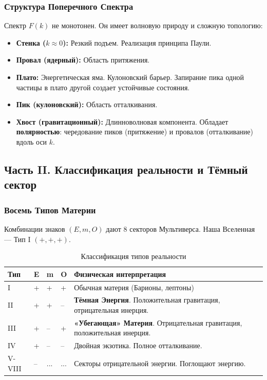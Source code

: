 \documentclass[12pt,a4paper]{article}
\begin{document}
\subsubsection{Структура Поперечного Спектра}
Спектр $F(k)$ не монотонен. Он имеет волновую природу и сложную топологию:
\begin{itemize}
    \item \textbf{Стенка ($k \approx 0$):} Резкий подъем. Реализация принципа Паули.
    \item \textbf{Провал (ядерный):} Область притяжения.
    \item \textbf{Плато:} Энергетическая яма. Кулоновский барьер. Запирание пика одной частицы в плато другой создает устойчивые состояния.
    \item \textbf{Пик (кулоновский):} Область отталкивания.
    \item \textbf{Хвост (гравитационный):} Длинноволновая компонента. Обладает \textbf{полярностью}: чередование пиков (притяжение) и провалов (отталкивание) вдоль оси $k$.
\end{itemize}

\subsection{Часть II. Классификация реальности и Тёмный сектор}

\subsubsection{Восемь Типов Материи}
Комбинации знаков $(E, m, O)$ дают 8 секторов Мультиверса. Наша Вселенная — Тип I $(+,+,+)$.

\begin{table}[h]
\centering
\caption{Классификация типов реальности}
\begin{tabular}{@{}lllll@{}}
\toprule
Тип & E & m & O & Физическая интерпретация \\ \midrule
I   & + & + & + & Обычная материя (Барионы, лептоны) \\
II  & + & + & -- & \textbf{Тёмная Энергия}. Положительная гравитация, отрицательная инерция. \\
III & + & -- & + & \textbf{«Убегающая» Материя}. Отрицательная гравитация, положительная инерция. \\
IV  & + & -- & -- & Двойная экзотика. Полное отталкивание. \\
V-VIII & -- & ... & ... & Секторы отрицательной энергии. Поглощают энергию. \\ \bottomrule
\end{tabular}
\end{table}
\end{document}
